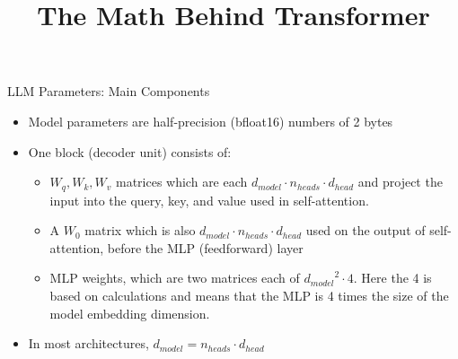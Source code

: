 



\newcommand{\learninggoals}{
\item Learn to calculate Transformer number of parameters
\item Understand Transformer computation and memory load
\item Learn about Flash Attentions
\item Understand Scaling Laws and Chinchilla
}
\def\myblue#1{\textcolor{texblue}{#1}}

\title{The Math Behind Transformer}
\date{}







\begin{vbframe}{LLM Parameters: Main Components}

\vfill

\begin{itemize}
    \item Model parameters are half-precision (bfloat16) numbers of 2 bytes
    \item One block (decoder unit) consists of:
		\begin{itemize}
		\item $W_q, W_k, W_v$ matrices which are each $d_{model} \cdot n_{heads} \cdot d_{head}$ and project the input into the query, key, and value used in self-attention. 
		\item A $W_0$ matrix which is also $d_{model} \cdot n_{heads} \cdot d_{head}$ used on the output of self-attention, before the MLP (feedforward) layer
		\item MLP weights, which are two matrices each of ${d_{model}}^2 \cdot 4$. Here the 4 is based on calculations and means that the MLP is 4 times the size of the model embedding dimension. 
		\end{itemize}
	\item In most architectures, $d_{model} = n_{heads} \cdot d_{head}$
\end{itemize}

\vfill

\end{vbframe}

